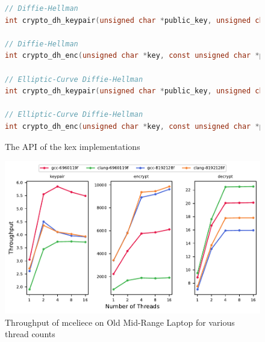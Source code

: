 \begin{figure}
    \centering
    \begin{lstlisting}[language=C]
// Diffie-Hellman
int crypto_dh_keypair(unsigned char *public_key, unsigned char *private_key, unsigned char *p, unsigned char *g);

// Diffie-Hellman
int crypto_dh_enc(unsigned char *key, const unsigned char *private_key, const unsigned char *public_key, unsigned char *p, unsigned char *g);

// Elliptic-Curve Diffie-Hellman
int crypto_dh_keypair(unsigned char *public_key, unsigned char *private_key);

// Elliptic-Curve Diffie-Hellman
int crypto_dh_enc(unsigned char *key, const unsigned char *private_key, const unsigned char *public_key);
    \end{lstlisting}
    \caption{The API of the \gls{kex} implementations}
    \label{figure:results:memory:kex-api}
\end{figure}

\begin{figure}
    \centering
    \includegraphics[scale=0.75]{chapters/results/throughput/Old Mid-Range Laptop_mceliece.pdf}
    \caption{Throughput of \gls{mceliece} on Old Mid-Range Laptop for various thread counts}
    \label{figure:results:throughput:mceliece-old-mid-range-laptop}
\end{figure}

